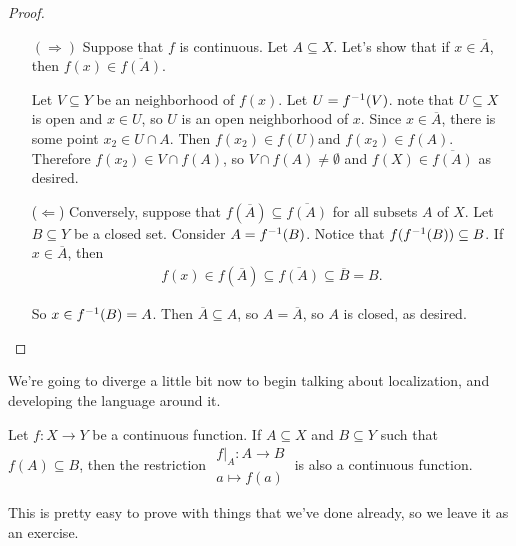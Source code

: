 \documentclass[12pt, twosided]{article}
\begin{document}
\begin{proof}
  \begin{enumerate}
  \item [\((\Rightarrow)\)] Suppose that \(f\) is continuous. Let \(A \subseteq X\). Let's show that if \(x \in \overline{A}\), then \(f(x) \in \overline{f(A)}\).

    Let \(V \subseteq Y\) be an neighborhood of \(f(x)\). Let \(U = f^{-1}(V)\). note that \(U \subseteq X\) is open and \(x \in U\), so \(U\) is an open neighborhood of \(x\). Since \(x \in \overline{A}\), there is some point \(x_2 \in U \cap A\). Then \(f(x_2) \in f(U)\)and \(f(x_2) \in f(A)\). Therefore \(f(x_2) \in V \cap f(A)\), so \(V \cap f(A) \neq \emptyset\) and \(f(X) \in \overline{f(A)}\) as desired. \partdone

  \item [(\(\Leftarrow\))] Conversely, suppose that \(f(\overline{A}) \subseteq \overline{f(A)}\) for all subsets \(A\) of \(X\). Let \(B \subseteq Y\) be a closed set. Consider \(A = f^{-1}(B)\). Notice that \(f(f^{-1}(B)) \subseteq B\). If \(x \in \overline{A}\), then
    \begin{align*}
      f(x) \in f(\overline{A}) \subseteq \overline{f(A)} \subseteq \overline{B} = B.
    \end{align*}

    So \(x \in f^{-1}(B) = A\). Then \(\overline{A} \subseteq A\), so \(A = \overline{A}\), so \(A\) is closed, as desired.
    \end{enumerate}
  \end{proof}

  We're going to diverge a little bit now to begin talking about localization, and developing the language around it.

  \begin{lm}
    Let \(f: X \to Y\) be a continuous function. If \(A \subseteq X\) and \(B \subseteq Y\) such that \(f(A) \subseteq B\), then the restriction \(
    \begin{matrix}
      f\vert_A : A \to B \\ a \mapsto f(a)
    \end{matrix}
    \) is also a continuous function.
    \begin{center}
    \end{center}
  \end{lm}
  This is pretty easy to prove with things that we've done already, so we leave it as an exercise.
\end{document}
